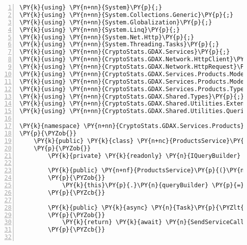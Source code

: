 \def\PYZbs{\char`\\}
\def\PYZus{\char`\_}
\def\PYZob{\char`\{}
\def\PYZcb{\char`\}}
\def\PYZca{\char`\^}
\def\PYZam{\char`\&}
\def\PYZlt{\char`\<}
\def\PYZgt{\char`\>}
\def\PYZsh{\char`\#}
\def\PYZpc{\char`\%}
\def\PYZdl{\char`\$}
\def\PYZhy{\char`\-}
\def\PYZsq{\char`\'}
\def\PYZdq{\char`\"}
\def\PYZti{\char`\~}
\def\PYZat{@}
\def\PYZlb{[}
\def\PYZrb{]}
\makeatother\begin{Verbatim}[commandchars=\\\{\},numbers=left,firstnumber=1,stepnumber=1,numberblanklines=0]
\PY{k}{using} \PY{n+nn}{System}\PY{p}{;}
\PY{k}{using} \PY{n+nn}{System.Collections.Generic}\PY{p}{;}
\PY{k}{using} \PY{n+nn}{System.Globalization}\PY{p}{;}
\PY{k}{using} \PY{n+nn}{System.Linq}\PY{p}{;}
\PY{k}{using} \PY{n+nn}{System.Net.Http}\PY{p}{;}
\PY{k}{using} \PY{n+nn}{System.Threading.Tasks}\PY{p}{;}
\PY{k}{using} \PY{n+nn}{CryptoStats.GDAX.Services}\PY{p}{;}
\PY{k}{using} \PY{n+nn}{CryptoStats.GDAX.Network.HttpClient}\PY{p}{;}
\PY{k}{using} \PY{n+nn}{CryptoStats.GDAX.Network.HttpRequest}\PY{p}{;}
\PY{k}{using} \PY{n+nn}{CryptoStats.GDAX.Services.Products.Models}\PY{p}{;}
\PY{k}{using} \PY{n+nn}{CryptoStats.GDAX.Services.Products.Models.Responses}\PY{p}{;}
\PY{k}{using} \PY{n+nn}{CryptoStats.GDAX.Services.Products.Types}\PY{p}{;}
\PY{k}{using} \PY{n+nn}{CryptoStats.GDAX.Shared.Types}\PY{p}{;}
\PY{k}{using} \PY{n+nn}{CryptoStats.GDAX.Shared.Utilities.Extensions}\PY{p}{;}
\PY{k}{using} \PY{n+nn}{CryptoStats.GDAX.Shared.Utilities.Queries}\PY{p}{;}

\PY{k}{namespace} \PY{n+nn}{CryptoStats.GDAX.Services.Products}
\PY{p}{\PYZob{}}
    \PY{k}{public} \PY{k}{class} \PY{n+nc}{ProductsService}\PY{p}{:} \PY{n}{AbstractService}
    \PY{p}{\PYZob{}}
        \PY{k}{private} \PY{k}{readonly} \PY{n}{IQueryBuilder} \PY{n}{queryBuilder}\PY{p}{;}

        \PY{k}{public} \PY{n+nf}{ProductsService}\PY{p}{(}\PY{n}{IHttpClient} \PY{n}{httpClient}\PY{p}{,} \PY{n}{IHttpRequestMessageService} \PY{n}{httpRequestMessageService}\PY{p}{,} \PY{n}{IQueryBuilder} \PY{n}{queryBuilder}\PY{p}{)} \PY{p}{:} \PY{k}{base}\PY{p}{(}\PY{n}{httpClient}\PY{p}{,} \PY{n}{httpRequestMessageService}\PY{p}{)}
        \PY{p}{\PYZob{}}
            \PY{k}{this}\PY{p}{.}\PY{n}{queryBuilder} \PY{p}{=} \PY{n}{queryBuilder}\PY{p}{;}
        \PY{p}{\PYZcb{}}

        \PY{k}{public} \PY{k}{async} \PY{n}{Task}\PY{p}{\PYZlt{}}\PY{n}{List}\PY{p}{\PYZlt{}}\PY{n}{Product}\PY{p}{\PYZgt{}}\PY{p}{\PYZgt{}} \PY{n}{GetAllProductsAsync}\PY{p}{(}\PY{p}{)}
        \PY{p}{\PYZob{}}
            \PY{k}{return} \PY{k}{await} \PY{n}{SendServiceCall}\PY{p}{\PYZlt{}}\PY{n}{List}\PY{p}{\PYZlt{}}\PY{n}{Product}\PY{p}{\PYZgt{}}\PY{p}{\PYZgt{}}\PY{p}{(}\PY{n}{HttpMethod}\PY{p}{.}\PY{n}{Get}\PY{p}{,} \PY{l+s}{\PYZdq{}/products\PYZdq{}}\PY{p}{)}\PY{p}{;}
        \PY{p}{\PYZcb{}}


\end{Verbatim}
